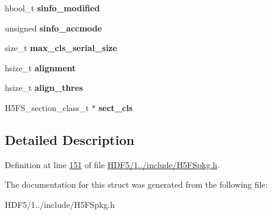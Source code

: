 \begin{DoxyCompactItemize}
\item 
\mbox{\label{struct_h5_f_s__t_a76156c955d83ec80c81d0a502b3c1a28}} 
hbool\+\_\+t {\bfseries sinfo\+\_\+modified}
\item 
\mbox{\label{struct_h5_f_s__t_afea4a7d0b6891fe83ac03f487552d802}} 
unsigned {\bfseries sinfo\+\_\+accmode}
\item 
\mbox{\label{struct_h5_f_s__t_a685f41f9e8e3e0b55d00ff52ca99bffd}} 
size\+\_\+t {\bfseries max\+\_\+cls\+\_\+serial\+\_\+size}
\item 
\mbox{\label{struct_h5_f_s__t_a7379f39beb04610602a57d5f0c16c8e3}} 
hsize\+\_\+t {\bfseries alignment}
\item 
\mbox{\label{struct_h5_f_s__t_a194b38242ced9633a4b71d8228f7fc25}} 
hsize\+\_\+t {\bfseries align\+\_\+thres}
\item 
\mbox{\label{struct_h5_f_s__t_a7a7e02b1359a8596c2c22a7801fe2cc3}} 
H5\+F\+S\+\_\+section\+\_\+class\+\_\+t $\ast$ {\bfseries sect\+\_\+cls}
\end{DoxyCompactItemize}


\subsection{Detailed Description}


Definition at line \hyperlink{_h_d_f5_21_810_81_2include_2_h5_f_spkg_8h_source_l00151}{151} of file \hyperlink{_h_d_f5_21_810_81_2include_2_h5_f_spkg_8h_source}{H\+D\+F5/1../include/\+H5\+F\+Spkg.\+h}.



The documentation for this struct was generated from the following file\+:\begin{DoxyCompactItemize}
\item 
H\+D\+F5/1../include/\+H5\+F\+Spkg.\+h\end{DoxyCompactItemize}
